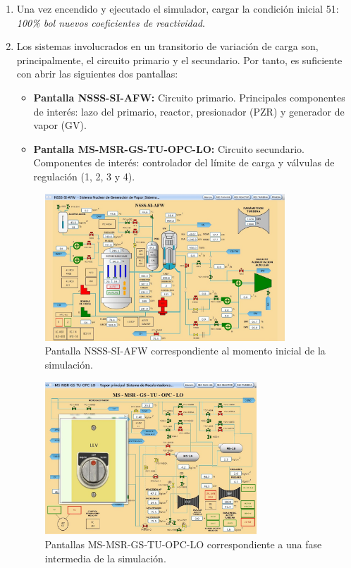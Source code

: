 \begin{enumerate}
  \item Una vez encendido y ejecutado el simulador, cargar la condición inicial 51: \textit{100\% \acrshort{bol} nuevos coeficientes de reactividad}.
  
  \item Los sistemas involucrados en un transitorio de variación de carga son, principalmente, el circuito primario y el secundario. Por tanto, es suficiente con abrir las siguientes dos pantallas:
  \begin{itemize}
    \item \textbf{Pantalla NSSS-SI-AFW:} Circuito primario. Principales componentes de interés: lazo del primario, reactor, presionador (PZR) y generador de vapor (GV).
    \item \textbf{Pantalla MS-MSR-GS-TU-OPC-LO:} Circuito secundario. Componentes de interés: controlador del límite de carga y válvulas de regulación (1, 2, 3 y 4).
    \end{itemize}

  \begin{figure}[h!]
    \centering
    \includegraphics[width=0.85\textwidth]{content/figures/pantalla1_simulacion1.JPG}
    \caption{Pantalla NSSS-SI-AFW correspondiente al momento inicial de la simulación.}
    \label{fig:pantalla1_simulacion1}
  \end{figure}

  \begin{figure}[h!]
    \centering
    \includegraphics[width=0.75\textwidth]{content/figures/pantalla2_simulacion2.JPG}
    \caption{Pantallas MS-MSR-GS-TU-OPC-LO correspondiente a una fase intermedia de la simulación.}
    \label{fig:pantalla2_simulacion1}
  \end{figure}


\end{enumerate}
